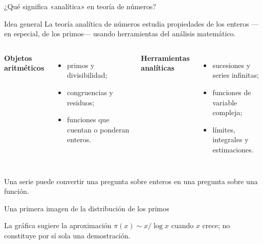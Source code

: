 \documentclass[aspectratio=169,11pt]{beamer}
\begin{document}
\begin{frame}{¿Qué significa «analítica» en teoría de números?}
    \begin{block}{Idea general}
        La teoría analítica de números estudia propiedades de los enteros —en especial, de los primos— usando herramientas del análisis matemático.
    \end{block}
    \begin{columns}[T,onlytextwidth]
        \textbf{Objetos aritméticos}
        \begin{itemize}
            \item primos y divisibilidad;
            \item congruencias y residuos;
            \item funciones que cuentan o ponderan enteros.
        \end{itemize}
        \textbf{Herramientas analíticas}
        \begin{itemize}
            \item sucesiones y series infinitas;
            \item funciones de variable compleja;
            \item límites, integrales y estimaciones.
        \end{itemize}
    \end{columns}
    \vfill
    \centering\small Una serie puede convertir una pregunta sobre enteros en una pregunta sobre una función.
\end{frame}

\begin{frame}{Una primera imagen de la distribución de los primos}
    \centering

    \vspace{-.1cm}
    \small La gráfica sugiere la aproximación $\pi(x)\sim x/\log x$ cuando $x$ crece; no constituye por sí sola una demostración.\;\cite[Capítulo 4]{Apostol1976-xj}
\end{frame}
\end{document}
